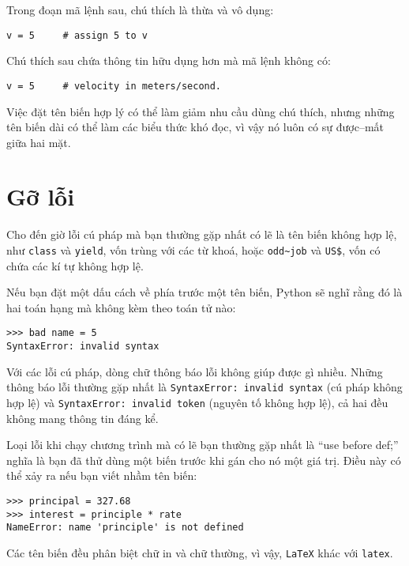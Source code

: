 \documentclass[11pt]{book}
\begin{document}
Trong đoạn mã lệnh sau, chú thích là thừa và vô dụng:

\beforeverb
\begin{verbatim}
v = 5     # assign 5 to v
\end{verbatim}
\afterverb
%
Chú thích sau chứa thông tin hữu dụng hơn mà mã lệnh không có:

\beforeverb
\begin{verbatim}
v = 5     # velocity in meters/second. 
\end{verbatim}
\afterverb
%
Việc đặt tên biến hợp lý có thể làm giảm nhu cầu dùng chú thích,
nhưng những tên biến dài có thể làm các biểu thức khó đọc, vì vậy
nó luôn có sự được--mất giữa hai mặt.

\section{Gỡ lỗi}

Cho đến giờ lỗi cú pháp mà bạn thường gặp nhất có lẽ là tên biến
không hợp lệ, như {\tt class} và {\tt yield}, vốn trùng với các
từ khoá, hoặc \verb"odd~job" và \verb"US$", vốn có chứa các kí tự
không hợp lệ.


Nếu bạn đặt một dấu cách về phía trước một tên biến, Python sẽ 
nghĩ rằng đó là hai toán hạng mà không kèm theo toán tử nào:

\beforeverb
\begin{verbatim}
>>> bad name = 5
SyntaxError: invalid syntax
\end{verbatim}
\afterverb
%
Với các lỗi cú pháp, dòng chữ thông báo lỗi không giúp được gì nhiều.
Những thông báo lỗi thường gặp nhất là {\tt SyntaxError: invalid syntax}
(cú pháp không hợp lệ) và {\tt SyntaxError: invalid token} (nguyên tố
không hợp lệ), cả hai đều không mang thông tin đáng kể.


Loại lỗi khi chạy chương trình mà có lẽ bạn thường gặp nhất là
``use before def;'' nghĩa là bạn đã thử dùng một biến trước khi
gán cho nó một giá trị. Điều này có thể xảy ra nếu bạn viết nhầm
tên biến:

\beforeverb
\begin{verbatim}
>>> principal = 327.68
>>> interest = principle * rate
NameError: name 'principle' is not defined
\end{verbatim}
\afterverb
%
Các tên biến đều phân biệt chữ in và chữ thường, vì vậy, {\tt LaTeX}
khác với {\tt latex}.
\end{document}
